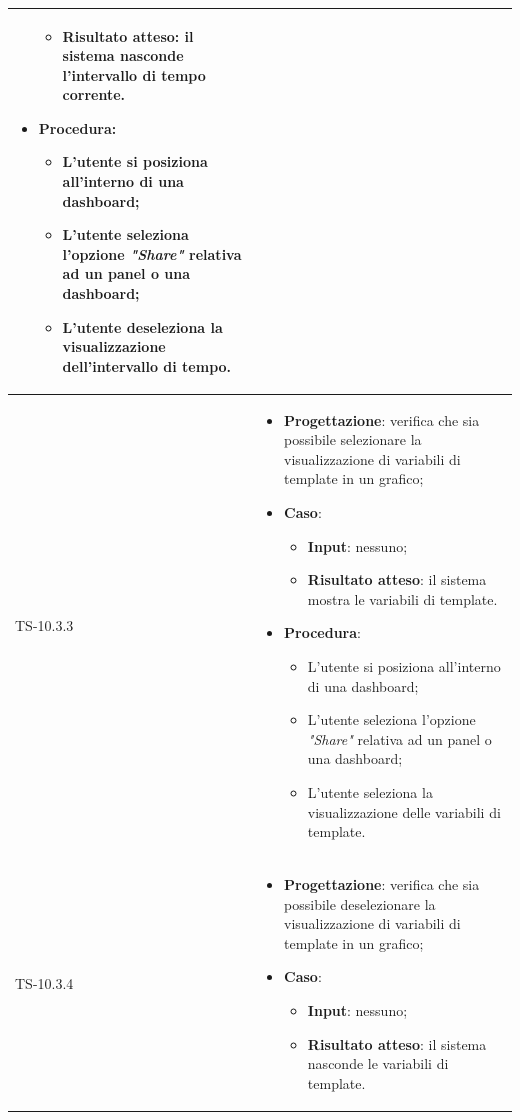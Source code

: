 \begin{longtable}{|C{2.5cm}|C{13cm}|}
\begin{itemize}
\begin{itemize}
		\item \textbf{Risultato atteso}: il sistema nasconde l'intervallo di tempo corrente.
	\end{itemize}
	\item \textbf{Procedura}:
	\begin{itemize}
		\item L'utente si posiziona all'interno di una dashboard;
		\item L'utente seleziona l'opzione \emph{"Share"} relativa ad un panel o una dashboard;
		\item L'utente deseleziona la visualizzazione dell'intervallo di tempo.
	\end{itemize} 
\end{itemize}
	 \\
	\hline
	{TS-10.3.3} &
\begin{itemize}
	\item \textbf{Progettazione}: verifica che sia possibile selezionare la
	visualizzazione di variabili di template in un grafico;
	\item \textbf{Caso}: 
	\begin{itemize}
		\item \textbf{Input}: nessuno;
		\item \textbf{Risultato atteso}: il sistema mostra le variabili di template.
	\end{itemize}
	\item \textbf{Procedura}:
	\begin{itemize}
		\item L'utente si posiziona all'interno di una dashboard;
		\item L'utente seleziona l'opzione \emph{"Share"} relativa ad un panel o una dashboard;
		\item L'utente seleziona la visualizzazione delle variabili di template.
	\end{itemize} 
\end{itemize}
	  \\
	\hline
	{TS-10.3.4} &
\begin{itemize}
	\item \textbf{Progettazione}: verifica che sia  possibile deselezionare la
	visualizzazione di variabili di template in un grafico;
	\item \textbf{Caso}: 
	\begin{itemize}
		\item \textbf{Input}: nessuno;
		\item \textbf{Risultato atteso}: il sistema nasconde le variabili di template.

\end{itemize}
\end{itemize}
\end{longtable}
